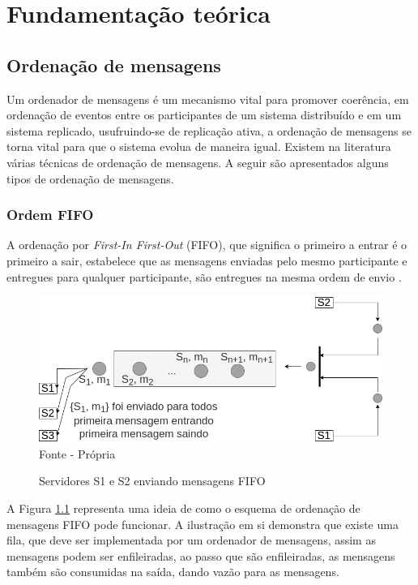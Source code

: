 \chapter{Fundamentação teórica}
\label{cap:fundamentacao}

\section{Ordenação de mensagens}
\label{sec:ordenacao_mensagens}

Um ordenador de mensagens é um mecanismo vital para promover coerência, em ordenação de eventos entre os participantes de um sistema distribuído e em um sistema replicado, usufruindo-se de replicação ativa, a ordenação de mensagens se torna vital para que o sistema evolua de maneira igual. Existem na literatura várias técnicas de ordenação de mensagens. A seguir são apresentados alguns tipos de ordenação de mensagens.

\subsection{Ordem FIFO}

A ordenação por \textit{First-In First-Out} (\gls{FIFO}), que significa o primeiro a entrar é o primeiro a sair, estabelece que as mensagens enviadas pelo mesmo participante e entregues para qualquer participante, são entregues na mesma ordem de envio \cite{PauloVerissimoLuisRodrigues}.

\begin{figure}[htb!]
    \centering
    \caption{Servidores S1 e S2 enviando mensagens FIFO}
    \includegraphics[width=0.8\linewidth]{figures/fifo.drawio.png}
    {\flushleft Fonte - Própria}
    \label{fig:fifo}
\end{figure}

A Figura \ref{fig:fifo} representa uma ideia de como o esquema de ordenação de mensagens FIFO pode funcionar. A ilustração em si demonstra que existe uma fila, que deve ser implementada por um ordenador de mensagens, assim as mensagens podem ser enfileiradas, ao passo que são enfileiradas, as mensagens também são consumidas na saída, dando vazão para as mensagens.

